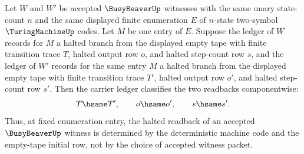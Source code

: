 \begin{theorem}
\label{thm:busybeaver-per-machine-halted-readback-determinacy}
Let $W$ and $W'$ be accepted $\BusyBeaverUp$ witnesses with the same unary
state-count $n$ and the same displayed finite enumeration $E$ of $n$-state
two-symbol $\TuringMachineUp$ codes. Let $M$ be one entry of $E$. Suppose the
ledger of $W$ records for $M$ a halted branch from the displayed empty tape
with finite transition trace $T$, halted output row $o$, and halted step-count
row $s$, and the ledger of $W'$ records for the same entry $M$ a halted branch
from the displayed empty tape with finite transition trace $T'$, halted output
row $o'$, and halted step-count row $s'$. Then the carrier ledger classifies
the two readbacks componentwise:
$$
  T\hsame T',\qquad o\hsame o',\qquad s\hsame s'.
$$
Thus, at fixed enumeration entry, the halted readback of an accepted
$\BusyBeaverUp$ witness is determined by the deterministic machine code and the
empty-tape initial row, not by the choice of accepted witness packet.
\end{theorem}
